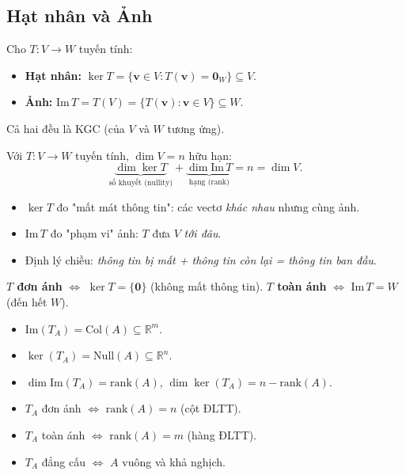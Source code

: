 \documentclass[12pt,a4paper]{article}
\begin{document}
\subsection{Hạt nhân và Ảnh}

\begin{dinhnghia}
  Cho $T: V \to W$ tuyến tính:
  \begin{itemize}
    \item \textbf{Hạt nhân:} $\ker T = \{\mathbf{v} \in V : T(\mathbf{v}) = \mathbf{0}_W\} \subseteq V$.
    \item \textbf{Ảnh:} $\mathrm{Im}\, T = T(V) = \{T(\mathbf{v}) : \mathbf{v} \in V\} \subseteq W$.
  \end{itemize}
  Cả hai đều là KGC (của $V$ và $W$ tương ứng).
\end{dinhnghia}

\begin{dinhly}[title={Định lý chiều (Rank-Nullity, phiên bản trừu tượng)}]
Với $T: V \to W$ tuyến tính, $\dim V = n$ hữu hạn:
\[
  \underbrace{\dim\ker T}_{\text{số khuyết (nullity)}} + \underbrace{\dim\mathrm{Im}\,T}_{\text{hạng (rank)}} = n = \dim V.
\]
\end{dinhly}

\begin{ynghia}
\begin{itemize}
  \item $\ker T$ đo "mất mát thông tin": các vectơ \emph{khác nhau} nhưng cùng ảnh.
  \item $\mathrm{Im}\, T$ đo "phạm vi" ảnh: $T$ đưa $V$ \emph{tới đâu}.
  \item Định lý chiều: \emph{thông tin bị mất + thông tin còn lại = thông tin ban đầu}.
\end{itemize}
\textbf{$T$ đơn ánh} $\Leftrightarrow$ $\ker T = \{\mathbf{0}\}$ (không mất thông tin).
\textbf{$T$ toàn ánh} $\Leftrightarrow$ $\mathrm{Im}\,T = W$ (đến hết $W$).
\end{ynghia}

\begin{luuy}[title={Liên hệ với ma trận $A \in \mathbb{R}^{m\times n}$, $T_A(\mathbf{x}) = A\mathbf{x}$}]
\begin{itemize}
  \item $\mathrm{Im}(T_A) = \mathrm{Col}(A) \subseteq \mathbb{R}^m$.
  \item $\ker(T_A) = \mathrm{Null}(A) \subseteq \mathbb{R}^n$.
  \item $\dim\mathrm{Im}(T_A) = \mathrm{rank}(A)$, $\dim\ker(T_A) = n - \mathrm{rank}(A)$.
  \item $T_A$ đơn ánh $\Leftrightarrow$ $\mathrm{rank}(A) = n$ (cột ĐLTT).
  \item $T_A$ toàn ánh $\Leftrightarrow$ $\mathrm{rank}(A) = m$ (hàng ĐLTT).
  \item $T_A$ đẳng cấu $\Leftrightarrow$ $A$ vuông và khả nghịch.
\end{itemize}
\end{luuy}
\end{document}
